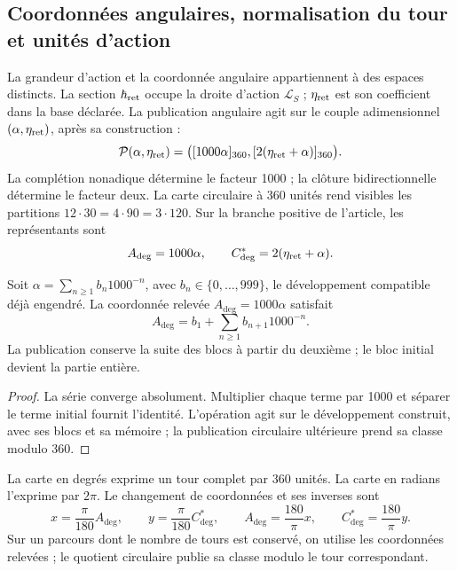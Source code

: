 \subsection{Coordonnées angulaires, normalisation du tour et unités d'action}
\label{v:v:ant:sec:ii-angulos}

La grandeur d'action et la coordonnée angulaire appartiennent à des espaces
distincts. La section \(\hbar_{\rm ret}\) occupe la droite d'action
\(\mathcal L_S\) ; \(\eta_{\rm ret}\) est son coefficient dans la base
déclarée. La publication angulaire agit sur le couple adimensionnel
\((\alpha,\eta_{\rm ret})\), après sa construction :
\begin{equation}
 \mathcal P(\alpha,\eta_{\rm ret})
 =\bigl([1000\alpha]_{360},[2(\eta_{\rm ret}+\alpha)]_{360}\bigr).
 \label{v:v:ant:eq:ii-par-angular}
\end{equation}
La complétion nonadique détermine le facteur 1000 ; la clôture
bidirectionnelle détermine le facteur deux. La carte circulaire à 360
unités rend visibles les partitions
\(12\cdot30=4\cdot90=3\cdot120\). Sur la branche positive de
l'article, les représentants sont
\[
 A_{\deg}=1000\alpha,\qquad
 C^*_{\deg}=2(\eta_{\rm ret}+\alpha).
\]

\begin{proposition}
\label{v:v:ant:prop:ii-desplazamiento-angular}
Soit \(\alpha=\sum_{n\geq1}b_n1000^{-n}\), avec
\(b_n\in\{0,\ldots,999\}\), le développement compatible déjà engendré.
La coordonnée relevée \(A_{\deg}=1000\alpha\) satisfait
\[
 A_{\deg}=b_1+\sum_{n\geq1}b_{n+1}1000^{-n}.
\]
La publication conserve la suite des blocs à partir du deuxième ;
le bloc initial devient la partie entière.
\end{proposition}
\begin{proof}
La série converge absolument. Multiplier chaque terme par 1000
et séparer le terme initial fournit l'identité. L'opération
agit sur le développement construit, avec ses blocs et sa mémoire ;
la publication circulaire ultérieure prend sa classe modulo 360.
\end{proof}

\begin{definition}
La carte en degrés exprime un tour complet par 360 unités.
La carte en radians l'exprime par \(2\pi\). Le changement de
coordonnées et ses inverses sont
\[
 x=\frac{\pi}{180}A_{\deg},\qquad
 y=\frac{\pi}{180}C^*_{\deg},\qquad
 A_{\deg}=\frac{180}{\pi}x,\qquad
 C^*_{\deg}=\frac{180}{\pi}y.
\]
Sur un parcours dont le nombre de tours est conservé, on utilise les
coordonnées relevées ; le quotient circulaire publie sa classe modulo
le tour correspondant.
\end{definition}

